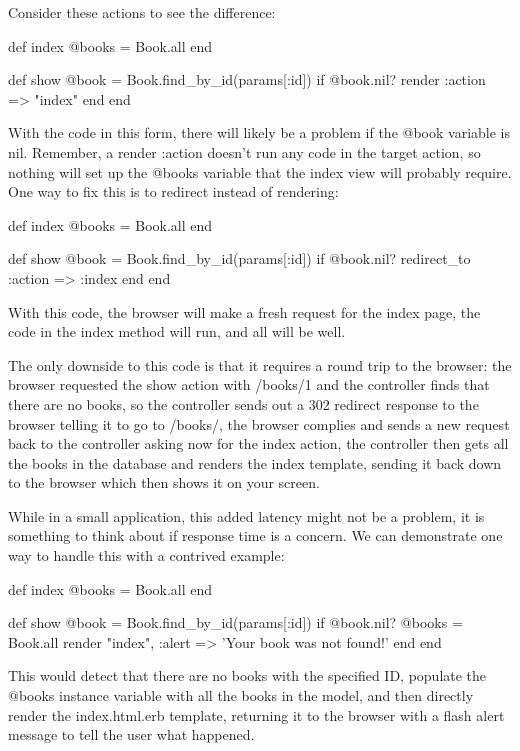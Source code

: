\documentclass[10pt]{book}
\newenvironment{code}{%
  \scriptsize
    \verbatim
}{%
    \endverbatim
    \newline
}
\begin{document}
Consider these actions to see the difference:
\begin{code}
def index
  @books = Book.all
end
 
def show
  @book = Book.find_by_id(params[:id])
  if @book.nil?
    render :action => "index"
  end
end
\end{code}

With the code in this form, there will likely be a problem if the @book variable is nil. Remember, a render :action doesn’t run any code in the target action, so nothing will set up the @books variable that the index view will probably require. One way to fix this is to redirect instead of rendering:
\begin{code}
def index
  @books = Book.all
end
 
def show
  @book = Book.find_by_id(params[:id])
  if @book.nil?
    redirect_to :action => :index
  end
end
\end{code}

With this code, the browser will make a fresh request for the index page, the code in the index method will run, and all will be well.

The only downside to this code is that it requires a round trip to the browser: the browser requested the show action with /books/1  and the controller finds that there are no books, so the controller  sends out a 302 redirect response to the browser telling it to go to /books/, the browser complies and sends a new request back to the controller asking now for the index  action, the controller then gets all the books in the database and  renders the index template, sending it back down to the browser which  then shows it on your screen.

While in a small application, this added latency might not be a  problem, it is something to think about if response time is a concern.  We can demonstrate one way to handle this with a contrived example:
\begin{code}
def index
  @books = Book.all
end
 
def show
  @book = Book.find_by_id(params[:id])
  if @book.nil?
    @books = Book.all
    render "index", :alert => 'Your book was not found!'
  end
end
\end{code}

This would detect that there are no books with the specified ID, populate the @books instance variable with all the books in the model, and then directly render the index.html.erb template, returning it to the browser with a flash alert message to tell the user what happened.
\end{document}
